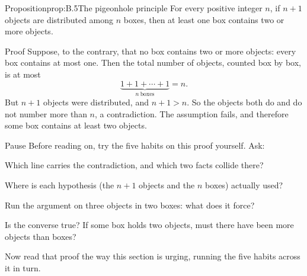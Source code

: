 \documentclass[a4paper,12pt,oneside]{memoir}
\begin{document}
\begin{envproposition}{Proposition}{prop:B.5}{The pigeonhole principle}
For every positive integer \(n\), if \(n + 1\) objects are distributed among \(n\) boxes, then at least one box contains two or more objects.
\end{envproposition}
\begin{envproof}{Proof}{}{}
Suppose, to the contrary, that no box contains two or more objects: every box contains at most one. Then the total number of objects, counted box by box, is at most \[ \underbrace{1 + 1 + \cdots + 1}_{n\ \text{boxes}} = n. \] But \(n + 1\) objects were distributed, and \(n + 1 > n\). So the objects both do and do not number more than \(n\), a contradiction. The assumption fails, and therefore some box contains at least two objects. \qedmark
\end{envproof}
\begin{envremark}{Pause}{}{}
Before reading on, try the five habits on this proof yourself. Ask:

\begin{steps}
  \item Which line carries the contradiction, and which two facts collide there?
  \item Where is each hypothesis (the \(n + 1\) objects and the \(n\) boxes) actually used?
  \item Run the argument on three objects in two boxes: what does it force?
  \item Is the converse true? If some box holds two objects, must there have been more objects than boxes?
\end{steps}
\end{envremark}
\pagebreakbefore
Now read that proof the way this section is urging, running the five habits across it in turn.
\end{document}
